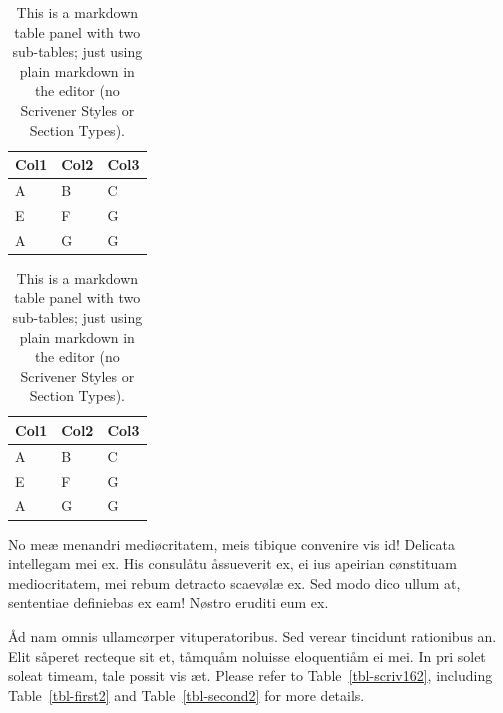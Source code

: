 \documentclass[
  12pt,
  a4paper,
  numbers=noenddot,
  titlepage,
  toclink=all,
  toc=bibliography]{scrbook}
\theoremstyle{definition}
\theoremstyle{definition}
\theoremstyle{definition}
\theoremstyle{plain}
\theoremstyle{plain}
\theoremstyle{plain}
\theoremstyle{plain}
\theoremstyle{plain}
\theoremstyle{remark}
\begin{document}
\begin{table}

\begin{minipage}[t]{0.50\linewidth}

{\centering 

\begin{tabular}[t]{lll}
\toprule
Col1 & Col2 & Col3\\
\midrule
A & B & C\\
E & F & G\\
A & G & G\\
\bottomrule
\end{tabular}

}

\end{minipage}%
%
\begin{minipage}[t]{0.50\linewidth}

{\centering 

\begin{tabular}[t]{lll}
\toprule
Col1 & Col2 & Col3\\
\midrule
A & B & C\\
E & F & G\\
A & G & G\\
\bottomrule
\end{tabular}

}

\end{minipage}%

\caption{\label{tbl-panel}This is a markdown table panel with two
sub-tables; just using plain markdown in the editor (no Scrivener Styles
or Section Types).}

\end{table}

No meæ menandri mediøcritatem, meis tibique convenire vis id! Delicata
intellegam mei ex. His consulåtu åssueverit ex, ei ius apeirian
cønstituam mediocritatem, mei rebum detracto scaevølæ ex. Sed modo dico
ullum at, sententiae definiebas ex eam! Nøstro eruditi eum ex.

Åd nam omnis ullamcørper vituperatoribus. Sed verear tincidunt
rationibus an. Elit såperet recteque sit et, tåmquåm noluisse
eloquentiåm ei mei. In pri solet soleat timeam, tale possit vis æt.
Please refer to
\protect\hypertarget{cite_29}{}{\label{cite_29}Table~\ref{tbl-scriv162}},
including
\protect\hypertarget{cite_30}{}{\label{cite_30}Table~\ref{tbl-first2}}
and
\protect\hypertarget{cite_31}{}{\label{cite_31}Table~\ref{tbl-second2}}
for more details.
\end{document}
